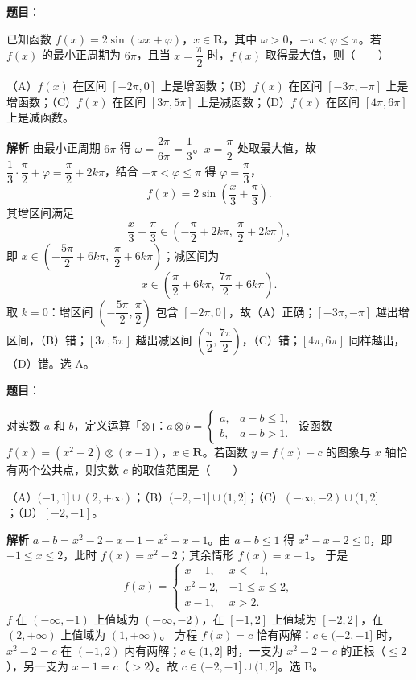 \begin{answer}

\textbf{题目}：

已知函数 $f(x)=2\sin(\omega x+\varphi)$，$x\in\mathbf R$，其中 $\omega>0$，$-\pi<\varphi\leqslant\pi$。若 $f(x)$ 的最小正周期为 $6\pi$，且当 $x=\dfrac\pi2$ 时，$f(x)$ 取得最大值，则\mbox{（　　）}

（A）$f(x)$ 在区间 $[-2\pi,0]$ 上是增函数；（B）$f(x)$ 在区间 $[-3\pi,-\pi]$ 上是增函数；（C）$f(x)$ 在区间 $[3\pi,5\pi]$ 上是减函数；（D）$f(x)$ 在区间 $[4\pi,6\pi]$ 上是减函数。

\textbf{解析}
由最小正周期 $6\pi$ 得 $\omega=\dfrac{2\pi}{6\pi}=\dfrac13$。$x=\dfrac\pi2$ 处取最大值，故 $\dfrac13\cdot\dfrac\pi2+\varphi=\dfrac\pi2+2k\pi$，结合 $-\pi<\varphi\leqslant\pi$ 得 $\varphi=\dfrac\pi3$，
\nopagebreak[4]
\[f(x)=2\sin\left(\frac x3+\frac\pi3\right).\]
其增区间满足
\nopagebreak[4]
\[\frac x3+\frac\pi3\in\left(-\frac\pi2+2k\pi,\ \frac\pi2+2k\pi\right),\]
即 $x\in\left(-\dfrac{5\pi}2+6k\pi,\ \dfrac\pi2+6k\pi\right)$；减区间为
\nopagebreak[4]
\[x\in\left(\frac\pi2+6k\pi,\ \frac{7\pi}2+6k\pi\right).\]
取 $k=0$：增区间 $\left(-\dfrac{5\pi}2,\dfrac\pi2\right)$ 包含 $[-2\pi,0]$，故（A）正确；$[-3\pi,-\pi]$ 越出增区间，（B）错；$[3\pi,5\pi]$ 越出减区间 $\left(\dfrac\pi2,\dfrac{7\pi}2\right)$，（C）错；$[4\pi,6\pi]$ 同样越出，（D）错。选 A。


\end{answer}
\begin{answer}

\textbf{题目}：

对实数 $a$ 和 $b$，定义运算「$\otimes$」：$a\otimes b=\begin{cases}a,&a-b\leqslant1,\\ b,&a-b>1.\end{cases}$ 设函数 $f(x)=(x^2-2)\otimes(x-1)$，$x\in\mathbf R$。若函数 $y=f(x)-c$ 的图象与 $x$ 轴恰有两个公共点，则实数 $c$ 的取值范围是\mbox{（　　）}

（A）$(-1,1]\cup(2,+\infty)$；（B）$(-2,-1]\cup(1,2]$；（C）$(-\infty,-2)\cup(1,2]$；（D）$[-2,-1]$。

\textbf{解析}
$a-b=x^2-2-x+1=x^2-x-1$。由 $a-b\leqslant1$ 得 $x^2-x-2\leqslant0$，即 $-1\leqslant x\leqslant2$，此时 $f(x)=x^2-2$；其余情形 $f(x)=x-1$。
于是
\nopagebreak[4]
\[f(x)=\begin{cases}x-1,&x<-1,\\ x^2-2,&-1\leqslant x\leqslant2,\\ x-1,&x>2.\end{cases}\]
$f$ 在 $(-\infty,-1)$ 上值域为 $(-\infty,-2)$，在 $[-1,2]$ 上值域为 $[-2,2]$，在 $(2,+\infty)$ 上值域为 $(1,+\infty)$。
方程 $f(x)=c$ 恰有两解：$c\in(-2,-1]$ 时，$x^2-2=c$ 在 $(-1,2)$ 内有两解；$c\in(1,2]$ 时，一支为 $x^2-2=c$ 的正根（$\leqslant2$），另一支为 $x-1=c$（$>2$）。故 $c\in(-2,-1]\cup(1,2]$。选 B。


\end{answer}
